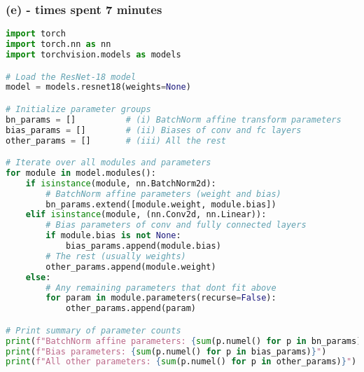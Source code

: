\documentclass[11pt, reqno, letterpaper, twoside]{amsart}
\theoremstyle{plain}
\theoremstyle{definition}
\begin{document}
\subsubsection*{(e) - times spent 7 minutes}
\begin{lstlisting}[language=Python, label={lst:resnet18_params}]
import torch
import torch.nn as nn
import torchvision.models as models

# Load the ResNet-18 model
model = models.resnet18(weights=None)

# Initialize parameter groups
bn_params = []          # (i) BatchNorm affine transform parameters
bias_params = []        # (ii) Biases of conv and fc layers
other_params = []       # (iii) All the rest

# Iterate over all modules and parameters
for module in model.modules():
    if isinstance(module, nn.BatchNorm2d):
        # BatchNorm affine parameters (weight and bias)
        bn_params.extend([module.weight, module.bias])
    elif isinstance(module, (nn.Conv2d, nn.Linear)):
        # Bias parameters of conv and fully connected layers
        if module.bias is not None:
            bias_params.append(module.bias)
        # The rest (usually weights)
        other_params.append(module.weight)
    else:
        # Any remaining parameters that dont fit above
        for param in module.parameters(recurse=False):
            other_params.append(param)

# Print summary of parameter counts
print(f"BatchNorm affine parameters: {sum(p.numel() for p in bn_params)}")
print(f"Bias parameters: {sum(p.numel() for p in bias_params)}")
print(f"All other parameters: {sum(p.numel() for p in other_params)}")
\end{lstlisting}
\end{document}
